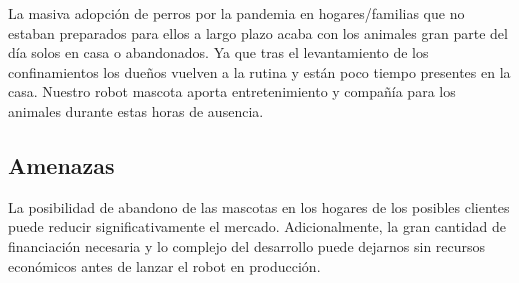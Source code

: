 \vspace{\baselineskip}

La masiva adopción de perros por la pandemia en hogares/familias que no estaban preparados para ellos a largo plazo acaba con los animales gran parte del día solos en casa o abandonados. Ya que tras el levantamiento de los confinamientos los dueños vuelven a la rutina y están poco tiempo presentes en la casa. Nuestro robot mascota aporta entretenimiento y compañía para los animales durante estas horas de ausencia.


\subsection{Amenazas}

La posibilidad de abandono de las mascotas en los hogares de los posibles clientes puede reducir significativamente el mercado. Adicionalmente, la gran cantidad de financiación necesaria y lo complejo del desarrollo puede dejarnos sin recursos económicos antes de lanzar el robot en producción.